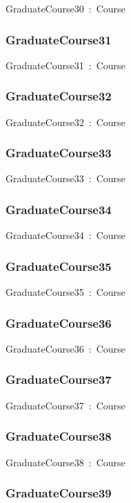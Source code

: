 \documentclass{article}
\begin{document}
GraduateCourse30~:~Course

\subsubsection*{GraduateCourse31}

GraduateCourse31~:~Course

\subsubsection*{GraduateCourse32}

GraduateCourse32~:~Course

\subsubsection*{GraduateCourse33}

GraduateCourse33~:~Course

\subsubsection*{GraduateCourse34}

GraduateCourse34~:~Course

\subsubsection*{GraduateCourse35}

GraduateCourse35~:~Course

\subsubsection*{GraduateCourse36}

GraduateCourse36~:~Course

\subsubsection*{GraduateCourse37}

GraduateCourse37~:~Course

\subsubsection*{GraduateCourse38}

GraduateCourse38~:~Course

\subsubsection*{GraduateCourse39}
\end{document}
